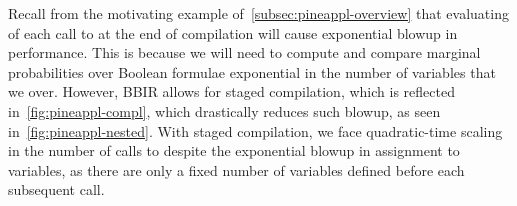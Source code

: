 Recall from the motivating example of~\cref{subsec:pineappl-overview} that
evaluating of each call to  at the end of compilation
will cause exponential blowup in performance.
This is because we will need to compute and compare marginal probabilities over
Boolean formulae
exponential in the number of variables that we  over.
However, BBIR allows for staged compilation, which is reflected in~\cref{fig:pineappl-compl},
which drastically reduces such blowup, as seen in~\cref{fig:pineappl-nested}.
With staged compilation, we face quadratic-time scaling in
the number of calls to  despite the exponential blowup in assignment to variables,
as there are only a fixed number of variables defined
before each subsequent  call.


